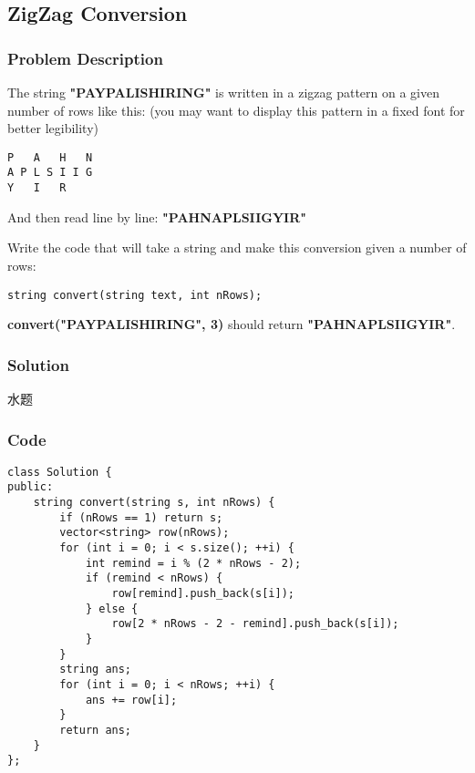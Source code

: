 \documentclass[courier]{article}
\begin{document}
\begin{CJK*}{UTF8}{gkai}
\subsection{ ZigZag Conversion }

\subsubsection*{Problem Description}
The string \textbf{"PAYPALISHIRING"} is written in a zigzag pattern on a given number of rows like this: (you may want to display this pattern in a fixed font for better legibility)
\begin{verbatim}
P   A   H   N
A P L S I I G
Y   I   R
\end{verbatim}

And then read line by line: \textbf{"PAHNAPLSIIGYIR"}

Write the code that will take a string and make this conversion given a number of rows:

\begin{verbatim}string convert(string text, int nRows);\end{verbatim}

\textbf{convert("PAYPALISHIRING", 3)} should return \textbf{"PAHNAPLSIIGYIR"}.



\subsubsection*{Solution}
水题

\subsubsection*{Code}
\begin{lstlisting}
class Solution {
public:
    string convert(string s, int nRows) {
        if (nRows == 1) return s;
        vector<string> row(nRows);
        for (int i = 0; i < s.size(); ++i) {
            int remind = i % (2 * nRows - 2);
            if (remind < nRows) {
                row[remind].push_back(s[i]);
            } else {
                row[2 * nRows - 2 - remind].push_back(s[i]);
            }
        }
        string ans;
        for (int i = 0; i < nRows; ++i) {
            ans += row[i];
        }
        return ans;
    }
};

\end{lstlisting}


\end{CJK*}
\end{document}
